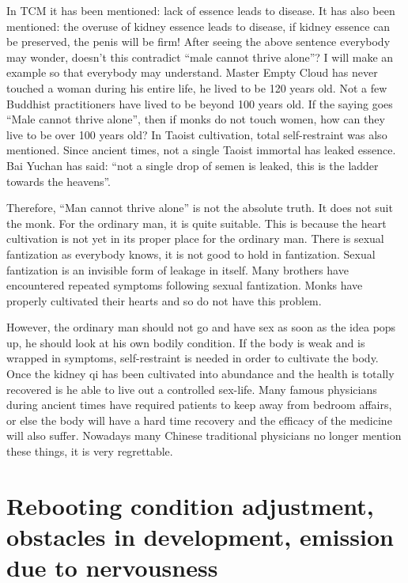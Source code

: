 \documentclass[
]{book}
\begin{document}
In TCM it has been mentioned: lack of essence leads to disease. It has also been mentioned: the overuse of kidney essence leads to disease, if kidney essence can be preserved, the penis will be firm! After seeing the above sentence everybody may wonder, doesn't this contradict ``male cannot thrive alone''? I will make an example so that everybody may understand. Master Empty Cloud has never touched a woman during his entire life, he lived to be 120 years old. Not a few Buddhist practitioners have lived to be beyond 100 years old. If the saying goes ``Male cannot thrive alone'', then if monks do not touch women, how can they live to be over 100 years old? In Taoist cultivation, total self-restraint was also mentioned. Since ancient times, not a single Taoist immortal has leaked essence. Bai Yuchan has said: ``not a single drop of semen is leaked, this is the ladder towards the heavens''.

Therefore, ``Man cannot thrive alone'' is not the absolute truth. It does not suit the monk. For the ordinary man, it is quite suitable. This is because the heart cultivation is not yet in its proper place for the ordinary man. There is sexual fantization as everybody knows, it is not good to hold in fantization. Sexual fantization is an invisible form of leakage in itself. Many brothers have encountered repeated symptoms following sexual fantization. Monks have properly cultivated their hearts and so do not have this problem.

However, the ordinary man should not go and have sex as soon as the idea pops up, he should look at his own bodily condition. If the body is weak and is wrapped in symptoms, self-restraint is needed in order to cultivate the body. Once the kidney qi has been cultivated into abundance and the health is totally recovered is he able to live out a controlled sex-life. Many famous physicians during ancient times have required patients to keep away from bedroom affairs, or else the body will have a hard time recovery and the efficacy of the medicine will also suffer. Nowadays many Chinese traditional physicians no longer mention these things, it is very regrettable.

\hypertarget{rebooting-condition-adjustment-obstacles-in-development-emission-due-to-nervousness}{%
\chapter{Rebooting condition adjustment, obstacles in development, emission due to nervousness}\label{rebooting-condition-adjustment-obstacles-in-development-emission-due-to-nervousness}}
\end{document}
